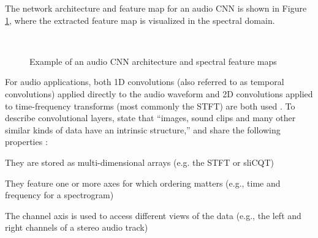 \documentclass[report.tex]{subfiles}
\begin{document}
The network architecture and feature map for an audio CNN is shown in Figure \ref{fig:audiocnn}, where the extracted feature map is visualized in the spectral domain.

\begin{figure}[ht]
	\centering
	\\
	\caption{Example of an audio CNN architecture and spectral feature maps}
	\label{fig:audiocnn}
\end{figure}

For audio applications, both 1D convolutions (also referred to as temporal convolutions) applied directly to the audio waveform and 2D convolutions applied to time-frequency transforms (most commonly the STFT) are both used \parencite{tcn, 2dconv}. To describe convolutional layers, \citeauthor{convguide} state that ``images, sound clips and many other similar kinds of data have an intrinsic structure,'' and share the following properties \parencite[6]{convguide}:

\begin{tight_enumerate}
	\item
		They are stored as multi-dimensional arrays (e.g. the STFT or sliCQT)
	\item
		They feature one or more axes for which ordering matters (e.g., time and frequency for a spectrogram)
	\item
		The channel axis is used to access different views of the data (e.g., the left and right channels of a stereo audio track)
\end{tight_enumerate}
\end{document}
